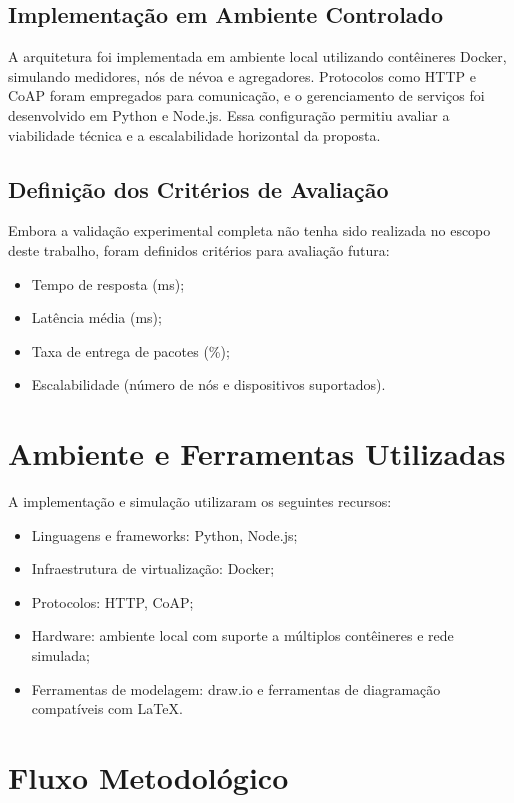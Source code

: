 \subsection{Implementação em Ambiente Controlado}
A arquitetura foi implementada em ambiente local utilizando contêineres Docker, simulando medidores, nós de névoa e agregadores. Protocolos como HTTP e CoAP foram empregados para comunicação, e o gerenciamento de serviços foi desenvolvido em Python e Node.js. Essa configuração permitiu avaliar a viabilidade técnica e a escalabilidade horizontal da proposta.

\subsection{Definição dos Critérios de Avaliação}
Embora a validação experimental completa não tenha sido realizada no escopo deste trabalho, foram definidos critérios para avaliação futura:
\begin{itemize}
    \item Tempo de resposta (ms);
    \item Latência média (ms);
    \item Taxa de entrega de pacotes (\%);
    \item Escalabilidade (número de nós e dispositivos suportados).
\end{itemize}

\section{Ambiente e Ferramentas Utilizadas}
A implementação e simulação utilizaram os seguintes recursos:
\begin{itemize}
    \item Linguagens e frameworks: Python, Node.js;
    \item Infraestrutura de virtualização: Docker;
    \item Protocolos: HTTP, CoAP;
    \item Hardware: ambiente local com suporte a múltiplos contêineres e rede simulada;
    \item Ferramentas de modelagem: draw.io e ferramentas de diagramação compatíveis com \LaTeX.
\end{itemize}

\section{Fluxo Metodológico}

